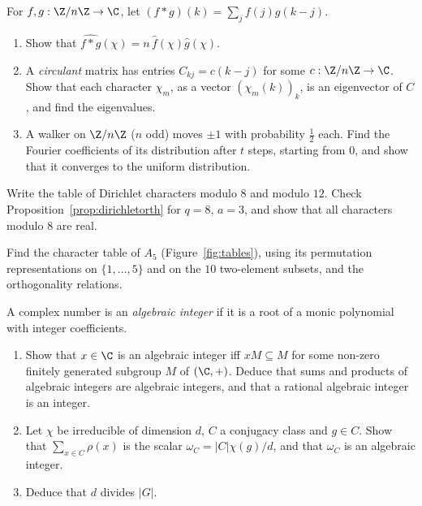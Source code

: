 \begin{exercise}[$\star\star$]\label{ex:circulant}
For $f,g:\Z/n\Z\to\C$, let $(f*g)(k)=\sum_jf(j)g(k-j)$.
\begin{enumerate}[label=(\alph*)]
\item Show that $\widehat{f*g}(\chi)=n\,\hat f(\chi)\hat g(\chi)$.
\item A \emph{circulant} matrix has entries $C_{kj}=c(k-j)$ for some $c:\Z/n\Z\to\C$. Show that each character $\chi_m$, as a vector $(\chi_m(k))_k$, is an eigenvector of $C$, and find the eigenvalues.
\item A walker on $\Z/n\Z$ ($n$ odd) moves $\pm1$ with probability $\frac12$ each. Find the Fourier coefficients of its distribution after $t$ steps, starting from $0$, and show that it converges to the uniform distribution.
\end{enumerate}
\end{exercise}

\begin{exercise}[$\star\star$]\label{ex:dirichlet8}
Write the table of Dirichlet characters modulo $8$ and modulo $12$. Check Proposition~\ref{prop:dirichletorth} for $q=8$, $a=3$, and show that all characters modulo $8$ are real.
\end{exercise}

\begin{exercise}[$\star\star\star$]\label{ex:a5}
Find the character table of $A_5$ (Figure~\ref{fig:tables}), using its permutation representations on $\{1,\dots,5\}$ and on the $10$ two-element subsets, and the orthogonality relations.
\end{exercise}

\begin{exercise}[$\star\star\star$]\label{ex:divides}
A complex number is an \emph{algebraic integer} if it is a root of a monic polynomial with integer coefficients.
\begin{enumerate}[label=(\alph*)]
\item Show that $x\in\C$ is an algebraic integer iff $xM\subseteq M$ for some non-zero finitely generated subgroup $M$ of $(\C,+)$. Deduce that sums and products of algebraic integers are algebraic integers, and that a rational algebraic integer is an integer.
\item Let $\chi$ be irreducible of dimension $d$, $C$ a conjugacy class and $g\in C$. Show that $\sum_{x\in C}\rho(x)$ is the scalar $\omega_C=|C|\chi(g)/d$, and that $\omega_C$ is an algebraic integer.
\item Deduce that $d$ divides $|G|$.
\end{enumerate}
\end{exercise}

